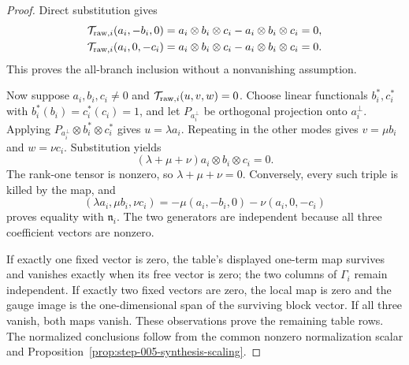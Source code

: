 \begin{proof}
Direct substitution gives
\[
\begin{aligned}
  \mathcal T_{{\rm raw},i}(a_i,-b_i,0)
  &=a_i\otimes b_i\otimes c_i-a_i\otimes b_i\otimes c_i=0,\\
  \mathcal T_{{\rm raw},i}(a_i,0,-c_i)
  &=a_i\otimes b_i\otimes c_i-a_i\otimes b_i\otimes c_i=0.
\end{aligned}
\]
This proves the all-branch inclusion without a nonvanishing assumption.

Now suppose \(a_i,b_i,c_i\ne0\) and
\(\mathcal T_{{\rm raw},i}(u,v,w)=0\). Choose linear functionals
\(b_i^*,c_i^*\) with \(b_i^*(b_i)=c_i^*(c_i)=1\), and let
\(P_{a_i^\perp}\) be orthogonal projection onto \(a_i^\perp\). Applying
\(P_{a_i^\perp}\otimes b_i^*\otimes c_i^*\) gives
\(u=\lambda a_i\). Repeating in the other modes gives
\(v=\mu b_i\) and \(w=\nu c_i\). Substitution yields
\[
  (\lambda+\mu+\nu)a_i\otimes b_i\otimes c_i=0.
\]
The rank-one tensor is nonzero, so \(\lambda+\mu+\nu=0\). Conversely, every
such triple is killed by the map, and
\[
  (\lambda a_i,\mu b_i,\nu c_i)
  =-\mu(a_i,-b_i,0)-\nu(a_i,0,-c_i)
\]
proves equality with \(\mathfrak n_i\). The two
generators are independent because all three coefficient vectors are nonzero.

If exactly one fixed vector is zero, the table's displayed one-term map
survives and vanishes exactly when its free vector is zero; the two columns of
\(\Gamma_i\) remain independent. If exactly two fixed vectors are zero, the
local map is zero and the gauge image is the one-dimensional span of the
surviving block vector. If all three vanish, both maps vanish. These
observations prove the remaining table rows. The normalized conclusions follow
from the common nonzero normalization scalar and
Proposition~\ref{prop:step-005-synthesis-scaling}. 

\end{proof}


